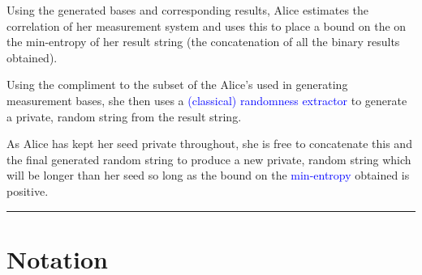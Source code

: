 \documentclass[12pt,letterpaper]{article}
\begin{document}
Using the generated bases and corresponding results, Alice estimates the correlation of her measurement system and uses this to place a bound on the on the min-entropy of her result string (the concatenation of all the binary results obtained). 

Using the compliment to the subset of the Alice's used in generating measurement bases, she then uses a \textcolor{blue}{(classical) randomness extractor} to generate a private, random string from the result string. 

As Alice has kept her seed private throughout, she is free to concatenate this and the final generated random string to produce a new private, random string which will be longer than her seed so long as the bound on the \textcolor{blue}{min-entropy} obtained is positive.
\newpage
\rule{\textwidth}{2pt}
\section*{Notation}
\end{document}
